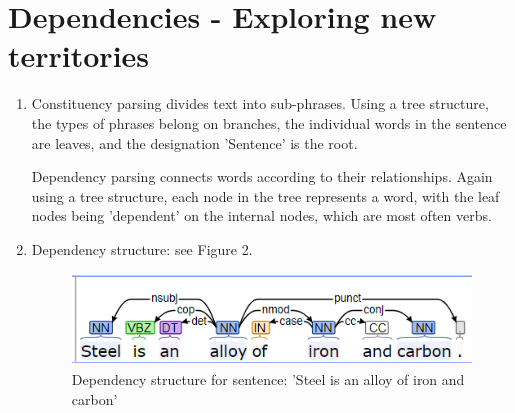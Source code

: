 \documentclass{article}
\begin{document}
\section{Dependencies - Exploring new territories}
\begin{enumerate}
  \item Constituency parsing divides text into sub-phrases. Using a tree
  structure, the types of phrases belong on branches, the individual words in
  the sentence are leaves, and the designation 'Sentence' is the root.\par

  \noindent Dependency parsing connects words according to their relationships.
  Again using a tree structure, each node in the tree represents a word, with
  the leaf nodes being 'dependent' on the internal nodes, which are most often
  verbs.
  \item Dependency structure: see Figure 2.
  \begin{figure}
    \includegraphics[width=\linewidth]{task3dep.PNG}
    \caption{Dependency structure for sentence: 'Steel is an alloy of iron and
    carbon'}
    \label{Cstruct}
  \end{figure}
\end{enumerate}
\end{document}
